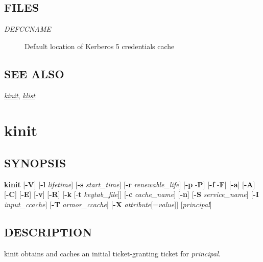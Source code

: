 \documentclass[letterpaper,10pt,english]{sphinxmanual}
\begin{document}
\subsection{FILES}
\label{user/user_commands/kdestroy:files}\begin{description}
\item[{\emph{DEFCCNAME}}] \leavevmode
Default location of Kerberos 5 credentials cache

\end{description}


\subsection{SEE ALSO}
\label{user/user_commands/kdestroy:see-also}
{\hyperref[user/user_commands/kinit:kinit-1]{\emph{kinit}}}, {\hyperref[user/user_commands/klist:klist-1]{\emph{klist}}}


\section{kinit}
\label{user/user_commands/kinit:kinit-1}\label{user/user_commands/kinit:kinit}\label{user/user_commands/kinit::doc}

\subsection{SYNOPSIS}
\label{user/user_commands/kinit:synopsis}
\textbf{kinit}
{[}\textbf{-V}{]}
{[}\textbf{-l} \emph{lifetime}{]}
{[}\textbf{-s} \emph{start\_time}{]}
{[}\textbf{-r} \emph{renewable\_life}{]}
{[}\textbf{-p} \textbar{} -\textbf{P}{]}
{[}\textbf{-f} \textbar{} -\textbf{F}{]}
{[}\textbf{-a}{]}
{[}\textbf{-A}{]}
{[}\textbf{-C}{]}
{[}\textbf{-E}{]}
{[}\textbf{-v}{]}
{[}\textbf{-R}{]}
{[}\textbf{-k} {[}-\textbf{t} \emph{keytab\_file}{]}{]}
{[}\textbf{-c} \emph{cache\_name}{]}
{[}\textbf{-n}{]}
{[}\textbf{-S} \emph{service\_name}{]}
{[}\textbf{-I} \emph{input\_ccache}{]}
{[}\textbf{-T} \emph{armor\_ccache}{]}
{[}\textbf{-X} \emph{attribute}{[}=\emph{value}{]}{]}
{[}\emph{principal}{]}


\subsection{DESCRIPTION}
\label{user/user_commands/kinit:description}
kinit obtains and caches an initial ticket-granting ticket for
\emph{principal}.
\end{document}
